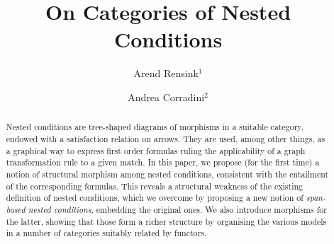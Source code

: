 \title{On Categories of Nested Conditions}

\author{Arend Rensink$^1$ \and Andrea Corradini$^2$}

\maketitle

\begin{abstract}
Nested conditions are tree-shaped diagrams of morphisms in a suitable category, endowed with a satisfaction relation on arrows. They are used, among other things, as a graphical way to express first order formulas ruling the applicability of a graph transformation rule to a given match. In this paper, we propose (for the first time) a notion of structural morphism among nested conditions, consistent with the entailment of the corresponding formulas. This reveals a structural weakness of the existing definition of nested conditions, which we overcome by proposing a new notion of \emph{span-based nested conditions}, embedding the original ones. We also introduce morphisms for the latter, showing that those form a richer structure by organising the various models in a number of categories suitably related by functors.
\end{abstract}
